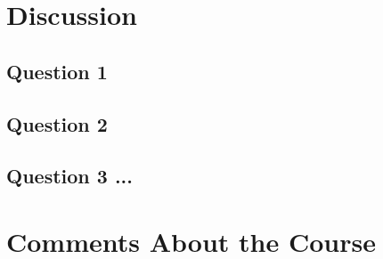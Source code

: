 \documentclass[a4paper]{scrartcl}
\begin{document}
\section{Discussion}

\subsection{Question 1}

\subsection{Question 2}

\subsection{Question 3 ...}

\section{Comments About the Course}
\end{document}
